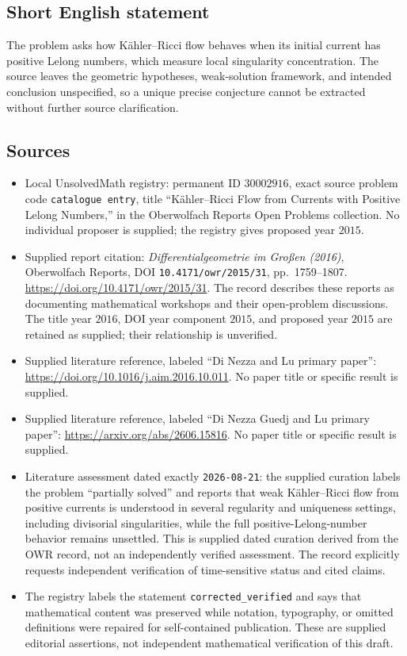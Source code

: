 \documentclass[11pt]{article}
\begin{document}
\subsection{Short English statement}
The problem asks how Kähler--Ricci flow behaves when its initial current has positive Lelong numbers, which measure local singularity concentration. The source leaves the geometric hypotheses, weak-solution framework, and intended conclusion unspecified, so a unique precise conjecture cannot be extracted without further source clarification.
\subsection{Sources}
\begin{itemize}
\item Local UnsolvedMath registry: permanent ID \(30002916\), exact source problem code \texttt{catalogue entry}, title ``Kähler--Ricci Flow from Currents with Positive Lelong Numbers,'' in the Oberwolfach Reports Open Problems collection. No individual proposer is supplied; the registry gives proposed year \(2015\).
\item Supplied report citation: \emph{Differentialgeometrie im Großen (2016)}, Oberwolfach Reports, DOI \texttt{10.4171/owr/2015/31}, pp.\ 1759--1807. \url{https://doi.org/10.4171/owr/2015/31}. The record describes these reports as documenting mathematical workshops and their open-problem discussions. The title year \(2016\), DOI year component \(2015\), and proposed year \(2015\) are retained as supplied; their relationship is unverified.
\item Supplied literature reference, labeled ``Di Nezza and Lu primary paper'': \url{https://doi.org/10.1016/j.aim.2016.10.011}. No paper title or specific result is supplied.
\item Supplied literature reference, labeled ``Di Nezza Guedj and Lu primary paper'': \url{https://arxiv.org/abs/2606.15816}. No paper title or specific result is supplied.
\item Literature assessment dated exactly \texttt{2026-08-21}: the supplied curation labels the problem ``partially solved'' and reports that weak Kähler--Ricci flow from positive currents is understood in several regularity and uniqueness settings, including divisorial singularities, while the full positive-Lelong-number behavior remains unsettled. This is supplied dated curation derived from the OWR record, not an independently verified assessment. The record explicitly requests independent verification of time-sensitive status and cited claims.
\item The registry labels the statement \texttt{corrected\_verified} and says that mathematical content was preserved while notation, typography, or omitted definitions were repaired for self-contained publication. These are supplied editorial assertions, not independent mathematical verification of this draft.
\end{itemize}
\end{document}
